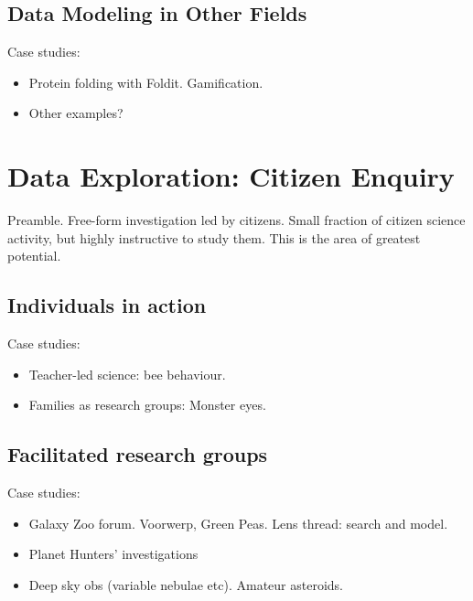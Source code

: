 \documentclass{ar2e}
\begin{document}

\subsection{Data Modeling in Other Fields}
\label{sec:model:astro}

Case studies:
\begin{itemize}
\item Protein folding with Foldit. Gamification.
\item Other examples? 
\end{itemize}



\section{Data Exploration: Citizen Enquiry}
\label{sec:explore}

Preamble. Free-form investigation led by citizens. Small fraction of citizen
science activity, but highly instructive to study them. This is the area of
greatest potential.



\subsection{Individuals in action}
\label{sec:explore:individuals}

Case studies:
\begin{itemize}
\item Teacher-led science: bee behaviour. 
\item Families as research groups: Monster eyes. %
\end{itemize}



\subsection{Facilitated research groups}
\label{sec:explore:groups}

Case studies:
\begin{itemize}
\item Galaxy Zoo forum. Voorwerp, Green Peas. Lens thread: search and model.
\item Planet Hunters' investigations
\item Deep sky obs (variable nebulae etc). Amateur asteroids.
\end{itemize}
\end{document}
